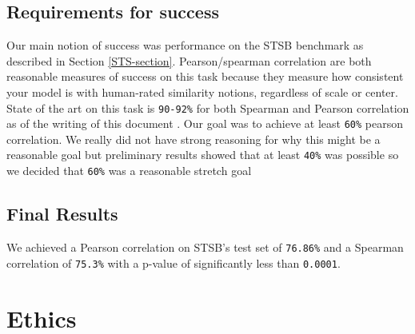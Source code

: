 \documentclass[14pt]{article}
\begin{document}
\subsection{Requirements for success}
Our main notion of success was performance on the STSB \cite{STS} benchmark as described in Section \ref{STS-section}. Pearson/spearman correlation are both reasonable measures of success on this task because they measure how consistent your model is with human-rated similarity notions, regardless of scale or center. State of the art on this task is \verb|90-92%| for both Spearman and Pearson correlation as of the writing of this document \cite{muennighoff2022mteb}. Our goal was to achieve at least \verb|60%| pearson correlation. We really did not have strong reasoning for why this might be a reasonable goal but preliminary results showed that at least \verb|40%| was possible so we decided that \verb|60%| was a reasonable stretch goal

\subsection{Final Results}
We achieved a Pearson correlation on STSB's test set of \verb|76.86%| and a Spearman correlation of \verb|75.3%| with a p-value of significantly less than \verb|0.0001|.

\section{Ethics}
\end{document}
